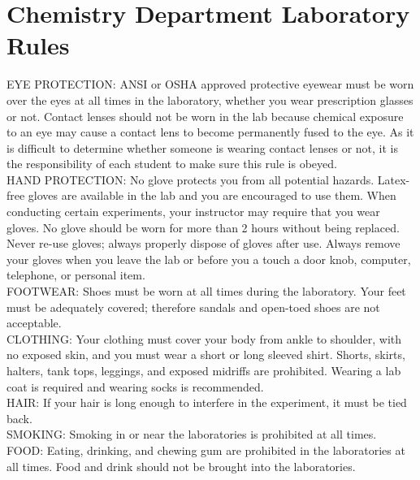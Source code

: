 \documentclass[12pt]{article}
\begin{document}
\section{Chemistry Department Laboratory Rules}
EYE PROTECTION: ANSI or OSHA approved protective eyewear must be worn over the eyes at all times in the laboratory, whether you wear prescription glasses or not.
Contact lenses should not be worn in the lab because chemical exposure to an eye may cause a contact lens to become permanently fused to the eye. As it is difficult to determine whether someone is wearing contact lenses or not, it is the responsibility of each student to make sure this rule is obeyed.\\
\newline %
HAND PROTECTION: No glove protects you from all potential hazards. Latex-free gloves are available in the lab and you are encouraged to use them. When conducting certain experiments, your instructor may require that you wear gloves. No glove should be worn for more than 2 hours without being replaced. Never re-use gloves; always properly dispose of gloves after use. Always remove your gloves when you leave the lab or before you a touch a door knob, computer, telephone, or personal item.\\
\newline %
FOOTWEAR: Shoes must be worn at all times during the laboratory. Your feet must be adequately covered; therefore sandals and open-toed shoes are not acceptable.\\
\newline %
CLOTHING: Your clothing must cover your body from ankle to shoulder, with no exposed skin, and you must wear a short or long sleeved shirt. Shorts, skirts, halters, tank tops, leggings, and exposed midriffs are prohibited. Wearing a lab coat is required and wearing socks is recommended.\\
\newline %
HAIR: If your hair is long enough to interfere in the experiment, it must be tied back.\\
\newline %
SMOKING: Smoking in or near the laboratories is prohibited at all times.\\
\newline %
FOOD: Eating, drinking, and chewing gum are prohibited in the laboratories at all times. Food and drink should not be brought into the laboratories.\\
\newline %
\end{document}
